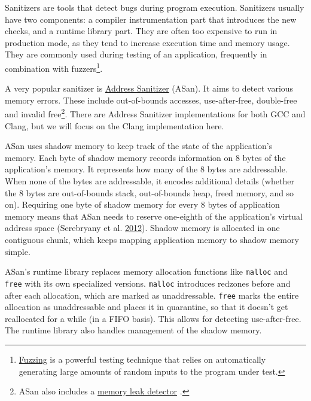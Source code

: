 \documentclass[a4paper,]{report}
\begin{document}
Sanitizers  are tools that detect bugs during program
execution. Sanitizers usually have two components: a compiler
instrumentation part that introduces the new checks, and a runtime
library part. They are often too expensive to run in production mode, as
they tend to increase execution time and memory usage. They are commonly
used during testing of an application, frequently in combination with
fuzzers\footnote{\href{https://en.wikipedia.org/wiki/Fuzzing}{Fuzzing}
   is a powerful testing technique that relies on
  automatically generating large amounts of random inputs to the program
  under test.}.

A very popular sanitizer is
\href{https://clang.llvm.org/docs/AddressSanitizer.html}{Address
Sanitizer} (ASan). It aims to detect
various memory errors. These include out-of-bounds accesses,
use-after-free, double-free and invalid free\footnote{ASan also includes
  a \href{https://clang.llvm.org/docs/LeakSanitizer.html}{memory leak
  detector} .}. There are Address Sanitizer
implementations for both GCC  and Clang, but we
will focus on the Clang implementation here.

ASan uses shadow memory to keep track of the state
of the application's memory. Each byte of shadow memory records
information on 8 bytes of the application's memory. It represents how
many of the 8 bytes are addressable. When none of the bytes are
addressable, it encodes additional details (whether the 8 bytes are
out-of-bounds stack, out-of-bounds heap, freed memory, and so on).
Requiring one byte of shadow memory for every 8 bytes of application
memory means that ASan needs to reserve one-eighth of the application's
virtual address space (Serebryany et al.
\protect\hyperlink{ref-Serebryany2012}{2012}). Shadow memory is
allocated in one contiguous chunk, which keeps mapping application
memory to shadow memory simple.

ASan's runtime library replaces memory allocation functions like
\texttt{malloc} and \texttt{free} with its own
specialized versions. \texttt{malloc} introduces redzones
before and after each allocation, which are marked as unaddressable.
\texttt{free} marks the entire allocation as unaddressable and places it
in quarantine, so that it doesn't get reallocated for a while (in a FIFO
basis). This allows for detecting use-after-free. The runtime library
also handles management of the shadow memory.
\end{document}
